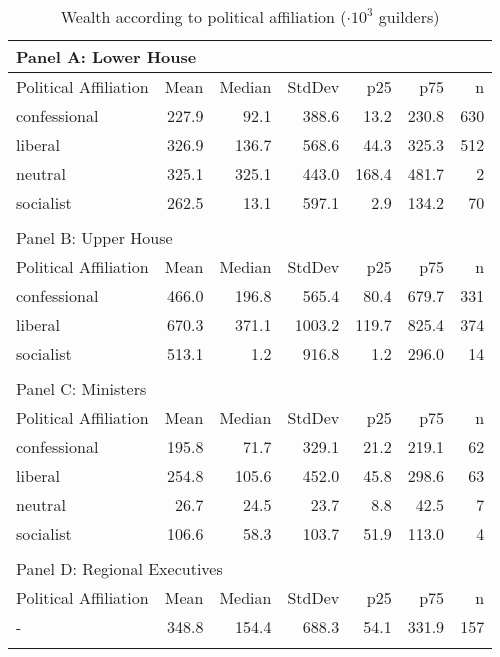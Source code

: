 \begin{table}[ht]
\centering
\begin{tabular}{lrrrrrr}
   
\multicolumn{7}{l}{Panel A: Lower House}\\ 
\hline
Political Affiliation & Mean & Median & StdDev & p25 & p75 & n \\\hline

confessional & 227.9 & 92.1 & 388.6 & 13.2 & 230.8 & 630 \\ 
  liberal & 326.9 & 136.7 & 568.6 & 44.3 & 325.3 & 512 \\ 
  neutral & 325.1 & 325.1 & 443.0 & 168.4 & 481.7 & 2 \\ 
  socialist & 262.5 & 13.1 & 597.1 & 2.9 & 134.2 & 70 \\ 
   \hline\\ 
\multicolumn{7}{l}{Panel B: Upper House}\\ 
\hline
Political Affiliation & Mean & Median & StdDev & p25 & p75 & n \\\hline
confessional & 466.0 & 196.8 & 565.4 & 80.4 & 679.7 & 331 \\ 
  liberal & 670.3 & 371.1 & 1003.2 & 119.7 & 825.4 & 374 \\ 
  socialist & 513.1 & 1.2 & 916.8 & 1.2 & 296.0 & 14 \\ 
   \hline\\ 
\multicolumn{7}{l}{Panel C: Ministers}\\ 
\hline
Political Affiliation & Mean & Median & StdDev & p25 & p75 & n \\\hline
confessional & 195.8 & 71.7 & 329.1 & 21.2 & 219.1 & 62 \\ 
  liberal & 254.8 & 105.6 & 452.0 & 45.8 & 298.6 & 63 \\ 
  neutral & 26.7 & 24.5 & 23.7 & 8.8 & 42.5 & 7 \\ 
  socialist & 106.6 & 58.3 & 103.7 & 51.9 & 113.0 & 4 \\ 
   \hline\\ 
\multicolumn{7}{l}{Panel D: Regional Executives}\\ 
\hline
Political Affiliation & Mean & Median & StdDev & p25 & p75 & n \\\hline
- & 348.8 & 154.4 & 688.3 & 54.1 & 331.9 & 157 \\ 
   \hline
\multicolumn{7}{l}{}\\
\end{tabular}
\caption{Wealth according to political affiliation ($\cdot 10^{3}$ guilders)} 
\label{tab:wealthfunction}
\end{table}